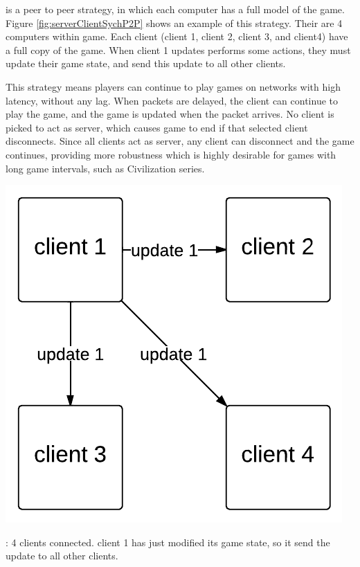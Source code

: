 \emph{\stepOneName} is a peer to peer strategy, in which each computer has a full model of the game. Figure \ref{fig:serverClientSychP2P} shows an example of this strategy. 
Their are 4 computers within game. Each client (client 1, client 2, client 3, and client4) have a full copy of the game.
When client 1 updates performs some actions, they must update their game state, and send this update to all other clients.

This strategy means players can continue to play games on networks with high latency, without any lag. When packets are delayed, the client can continue to play the game, and the game is updated when the packet arrives.
No client is picked to act as server, which causes game to end if that selected client disconnects.
Since all clients act as server, any client can disconnect and the game continues, providing more robustness which is highly desirable for games with long game intervals, such as Civilization series\cite{civilizationInMyPants}.



\begin{marginfigure}
	\includegraphics{res/computer_communication_architecture/ServerClientSynchronizationP2P.pdf}
	\caption[\stepOneName : description]{
	\stepOneName : 4 clients connected. client 1 has just modified its game state, so it send the update to all other clients.
	}
	\label{fig:serverClientSychP2P}
\end{marginfigure}

